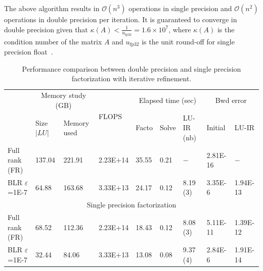 \documentclass[a4paper,12pt]{article}
\begin{document}
The above algorithm results in $\mathcal{O}(n^3)$ operations in single
precision and $\mathcal{O}(n^2)$ operations in double precision per
iteration. It is guaranteed to converge in double precision given that
$\kappa(A) < \frac{1}{u_{\text{fp32}}}=1.6 \times 10^7$, where
$\kappa(A)$ is the condition number of the matrix $A$ and
$u_{\text{fp32}}$ is the unit round-off for single precision
float~\cite{a.b.h.l.:22,c.h:18}.

\begin{table}[htbp]
    \centering
    \caption{Performance comparison between double precision and single precision factorization with iterative refinement.}
    \begin{center}
        \begin{tabular}{ p{1.5cm}| p{1.5cm}| p{1cm}| p{1.7cm}| p{1cm}| p{1cm}| p{1cm}| p{1.2cm}| p{1.2cm} }
            \hline
            \hline
            \multirow{2}{2em}{}    & \multicolumn{2}{c|}{Memory study (GB)} & \multirow{2}{2em}{FLOPS} & \multicolumn{3}{c|}{Elapsed time (sec)} & \multicolumn{2}{c}{Bwd error}                                            \\
                                   & Size $\vert LU\vert$                   & Memory used              &                                         & Facto                         & Solve & LU-IR (nb) & Initial  & LU-IR    \\
            \hline
            \hline
            Full rank (FR)         & 137.04                                 & 221.91                   & 2.23E+14                                & 35.55                         & 0.21  & $-$        & 2.81E-16 & $-$      \\
            \hline
            BLR $\varepsilon$=1E-7 & 64.88                                  & 163.68                   & 3.33E+13                                & 24.17                         & 0.12  & 8.19 (3)   & 3.35E-6  & 1.94E-13 \\
            \hline
            \multicolumn{9}{c}{Single precision factorization}                                                                                                                                                              \\
            \hline
            Full rank (FR)         & 68.52                                  & 112.36                   & 2.23E+14                                & 18.43                         & 0.12  & 8.08 (3)   & 5.11E-11 & 1.39E-12 \\
            \hline
            BLR $\varepsilon$=1E-7 & 32.44                                  & 84.06                    & 3.33E+13                                & 13.08                         & 0.08  & 9.37 (4)   & 2.84E-6  & 1.91E-14 \\
            \hline
            \hline
        \end{tabular}
    \end{center}
    \label{table:SinD-IR}
\end{table}
\end{document}
